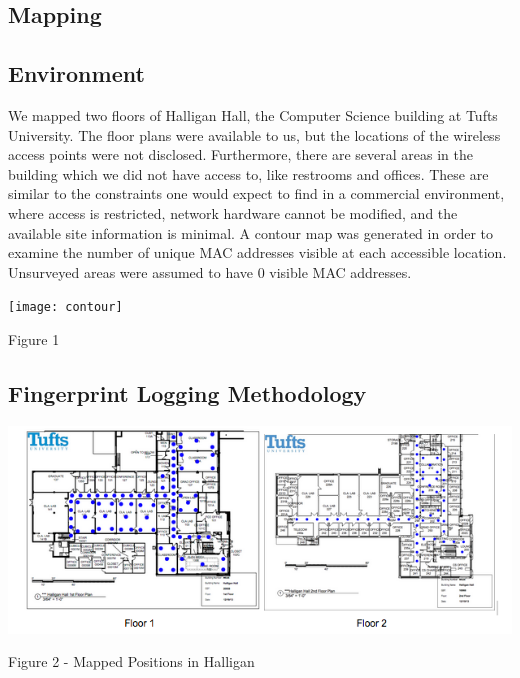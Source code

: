 \documentclass[twoside]{article}
\begin{document}
\begin{multicols}{2}

\section{Mapping}

\subsection{Environment}

\indent We mapped two floors of Halligan Hall, the Computer Science building at Tufts University. The floor plans were available to us, but the locations of the wireless access points were not disclosed. Furthermore, there are several areas in the building which we did not have access to, like restrooms and offices. These are similar to the constraints one would expect to find in a commercial environment, where access is restricted, network hardware cannot be modified, and the available site information is minimal. A contour map was generated in order to examine the number of unique MAC addresses visible at each accessible location. Unsurveyed areas were assumed to have 0 visible MAC addresses.

\texttt{[image: contour]}
\begin{center}
Figure 1
\end{center}

\subsection{Fingerprint Logging Methodology}

\includegraphics[width=\linewidth]{locations}
\begin{center}
Figure 2 - Mapped Positions in Halligan
\end{center}
          

\end{multicols}
\end{document}
